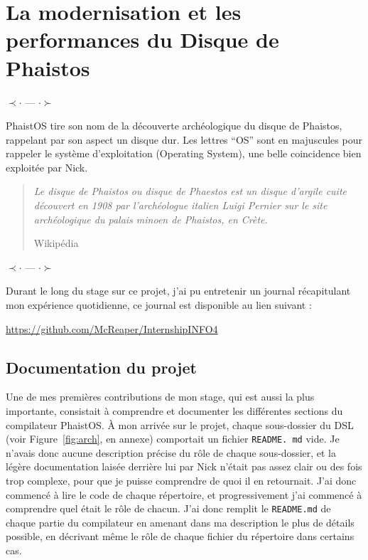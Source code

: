 \section{La modernisation et les performances du Disque de Phaistos}
\label{contrib}

\begin{center}
    $\prec \cdot$ --- $\cdot \succ$ 
\end{center}

PhaistOS tire son nom de la découverte archéologique du disque de Phaistos, 
rappelant par son aspect un disque dur. Les lettres ``OS'' sont en majuscules 
pour rappeler le système d'exploitation (Operating System), une belle 
coincidence bien exploitée par Nick. 

\blockquote[Wikipédia][--]{\textit{Le disque de Phaistos ou disque de Phaestos 
est un disque d'argile cuite découvert en 1908 par l'archéologue italien Luigi 
Pernier sur le site archéologique du palais minoen de Phaistos, en Crète.}
}

\begin{center}
    $\prec \cdot$ --- $\cdot \succ$ 
\end{center}

Durant le long du stage sur ce projet, j'ai pu entretenir un journal 
récapitulant mon expérience quotidienne, ce journal est disponible au lien 
suivant :

\begin{center}
\href{https://github.com/McReaper/InternshipINFO4}{https://github.com/McReaper/InternshipINFO4}
\end{center}

\subsection{Documentation du projet}

Une de mes premières contributions de mon stage, qui est aussi la plus 
importante, consistait à comprendre et documenter les différentes sections du 
compilateur PhaistOS. À mon arrivée sur le projet, chaque sous-dossier du DSL 
(voir Figure~\ref{fig:arch}, en annexe) comportait un fichier \texttt{README.
md} vide. Je n'avais donc aucune description précise du rôle de chaque 
sous-dossier, et la légère documentation laisée derrière lui par Nick n'était 
pas assez clair ou des fois trop complexe, pour que je puisse comprendre de 
quoi il en retournait. J'ai donc commencé à lire le code de chaque répertoire, 
et progressivement j'ai commencé à comprendre quel était le rôle de chacun. 
J'ai donc remplit le \texttt{README.md} de chaque partie du compilateur en 
amenant dans ma description le plus de détails possible, en décrivant même le 
rôle de chaque fichier du répertoire dans certains cas. 


